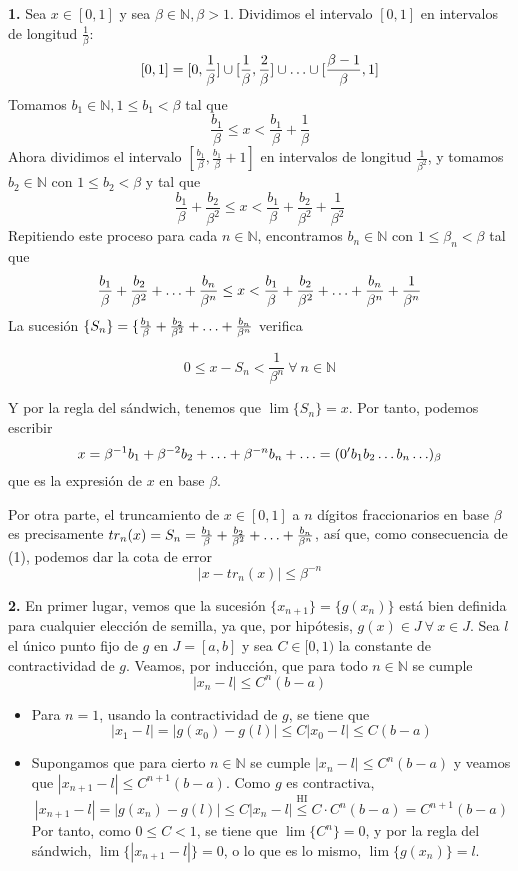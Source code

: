 \documentclass[12pt]{report}
\newcommand{\N}{\mathbb N}
\begin{document}
\textbf{1. } Sea $x \in [0,1]$ y sea $\beta \in \N, \beta > 1$. Dividimos el intervalo $[0,1]$ en intervalos de longitud $\frac{1}{\beta}$:
\[[0,1] = [0,\frac{1}{\beta}] \cup [\frac{1}{\beta},\frac{2}{\beta}] \cup \mathellipsis \cup [\frac{\beta-1}{\beta},1]\]
Tomamos $b_1 \in \N, 1 \leq b_1 < \beta$ tal que
\[\frac{b_1}{\beta} \leq x < \frac{b_1}{\beta}+\frac{1}{\beta}\] Ahora dividimos el intervalo $[\frac{b_1}{\beta},\frac{b_1}{\beta}+1]$ en intervalos de longitud $\frac{1}{\beta^2}$, y tomamos $b_2 \in \N$ con $ 1 \leq b_2 < \beta$ y tal que
\[\frac{b_1}{\beta}+\frac{b_2}{\beta^2} \leq x < \frac{b_1}{\beta}+\frac{b_2}{\beta^2} + \frac{1}{\beta^2}\]
Repitiendo este proceso para cada $n \in \N$, encontramos $b_n \in \N$ con $1 \leq \beta_n < \beta$ tal que
\[\frac{b_1}{\beta}+\frac{b_2}{\beta^2}+\mathellipsis+\frac{b_n}{\beta^n} \leq x < \frac{b_1}{\beta}+\frac{b_2}{\beta^2}+\mathellipsis+\frac{b_n}{\beta^n} + \frac{1}{\beta^n}\]
La sucesión $\{S_n\} = \{\frac{b_1}{\beta}+\frac{b_2}{\beta^2}+\mathellipsis+\frac{b_n}{\beta^n}$ verifica

\begin{equation}
0 \leq x - S_n < \frac{1}{\beta^n} \ \forall \ n \in \N
\end{equation}

Y por la regla del sándwich, tenemos que $\lim{\{S_n\}} = x$. Por tanto, podemos escribir
\[x = \beta^{-1}b_1 + \beta^{-2}b_2 + \mathellipsis + \beta^{-n}b_n + \mathellipsis = (0'b_1b_2 \mathellipsis b_n \mathellipsis)_{\beta}\]
que es la expresión de $x$ en base $\beta$.

\vspace{2mm}
Por otra parte, el truncamiento de $x \in [0,1]$ a $n$ dígitos fraccionarios en base $\beta$ es precisamente $tr_n(x) = S_n = \frac{b_1}{\beta}+\frac{b_2}{\beta^2}+\mathellipsis+\frac{b_n}{\beta^n}$, así que, como consecuencia de (1), podemos dar la cota de error
\[|x - tr_n(x)| \leq \beta^{-n}\]

\vspace{2mm}
\textbf{2. } En primer lugar, vemos que la sucesión $\{x_{n+1}\} = \{g(x_n)\}$ está bien definida para cualquier elección de semilla, ya que, por hipótesis, $g(x) \in J \ \forall \ x \in J$. Sea $l$ el único punto fijo de $g$ en $J = [a,b]$ y sea $C \in [0,1)$ la constante de contractividad de $g$. Veamos, por inducción, que para todo $n \in \N$ se cumple
\[|x_{n} - l| \leq C^n(b-a)\]
\begin{itemize}
    \item Para $n = 1$, usando la contractividad de $g$, se tiene que 
    \[|x_1 - l| = |g(x_0) - g(l)| \leq C|x_0 -l| \leq C(b-a)\]
    \item Supongamos que para cierto $n \in \N$ se cumple $|x_n - l| \leq C^n(b-a)$ y veamos que $|x_{n+1}-l| \leq C^{n+1}(b-a)$. Como $g$ es contractiva,
    \[|x_{n+1} - l| = |g(x_n) - g(l)| \leq C|x_n - l|  \overset{{\textrm{HI}}}{\leq} C \cdot C^n(b-a) = C^{n+1}(b-a)\]
    Por tanto, como $0 \leq C < 1$, se tiene que $\lim{\{C^n\}} = 0$, y por la regla del sándwich, $\lim{\{|x_{n+1} - l|\}} = 0$, o lo que es lo mismo, $\lim{\{g(x_n)\}} = l$.
\end{itemize}
\end{document}
